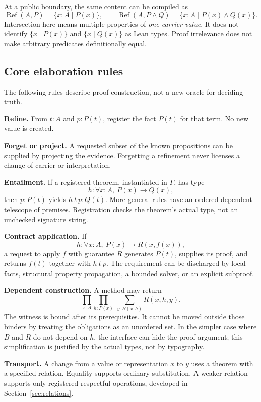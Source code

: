 \documentclass[11pt,a4paper]{article}
\newcommand{\RefineType}{\operatorname{Ref}}
\theoremstyle{plain}\newtheorem{proposition}{Proposition}[section]
\theoremstyle{definition}\newtheorem{definition}[proposition]{Definition}
\theoremstyle{remark}\newtheorem{remark}[proposition]{Remark}
\begin{document}
At a public boundary, the same content can be compiled as
\[
 \RefineType(A,P)=\{x:A\mid P(x)\},
 \qquad
 \RefineType(A,P\wedge Q)=\{x:A\mid P(x)\wedge Q(x)\}.
\]
Intersection here means multiple properties of \emph{one carrier value}. It does not identify \(\{x\mid P(x)\}\) and \(\{x\mid Q(x)\}\) as Lean types. Proof irrelevance does not make arbitrary predicates definitionally equal.

\subsection{Core elaboration rules}
The following rules describe proof construction, not a new oracle for deciding truth.

\textbf{Refine.} From \(t:A\) and \(p:P(t)\), register the fact \(P(t)\) for that term. No new value is created.

\textbf{Forget or project.} A requested subset of the known propositions can be supplied by projecting the evidence. Forgetting a refinement never licenses a change of carrier or interpretation.

\textbf{Entailment.} If a registered theorem, instantiated in \(\Gamma\), has type
\[
 h:\forall x:A,\ P(x)\to Q(x),
\]
then \(p:P(t)\) yields \(h\ t\ p:Q(t)\). More general rules have an ordered dependent telescope of premises. Registration checks the theorem's actual type, not an unchecked signature string.

\textbf{Contract application.} If
\[
 h:\forall x:A,\ P(x)\to R(x,f(x)),
\]
a request to apply \(f\) with guarantee \(R\) generates \(P(t)\), supplies its proof, and returns \(f(t)\) together with \(h\ t\ p\). The requirement can be discharged by local facts, structural property propagation, a bounded solver, or an explicit subproof.

\textbf{Dependent construction.} A method may return
\[
 \prod_{x:A}\prod_{h:P(x)}\ \sum_{y:B(x,h)} R(x,h,y).
\]
The witness is bound after its prerequisites. It cannot be moved outside those binders by treating the obligations as an unordered set. In the simpler case where \(B\) and \(R\) do not depend on \(h\), the interface can hide the proof argument; this simplification is justified by the actual types, not by typography.

\textbf{Transport.} A change from a value or representation \(x\) to \(y\) uses a theorem with a specified relation. Equality supports ordinary substitution. A weaker relation supports only registered respectful operations, developed in Section~\ref{sec:relations}.
\end{document}
